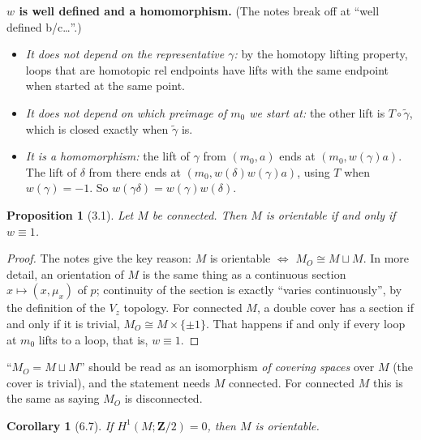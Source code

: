 \documentclass[11pt]{article}
\newcommand{\Z}{\mathbf{Z}}
\newcommand{\MO}{M_O}
\newcommand{\iso}{\cong}
\theoremstyle{namedit}
\newtheorem{cor}{Corollary}
\newtheorem{prop}{Proposition}
\theoremstyle{namedrm}
\begin{document}
\begin{filled}
\textbf{$w$ is well defined and a homomorphism.} (The notes break off at ``well defined b/c\ldots''.)
\begin{itemize}
  \item \emph{It does not depend on the representative $\gamma$:} by the homotopy lifting property,
        loops that are homotopic rel endpoints have lifts with the same endpoint when started at the
        same point.
  \item \emph{It does not depend on which preimage of $m_0$ we start at:} the other lift is
        $T\circ\tilde\gamma$, which is closed exactly when $\tilde\gamma$ is.
  \item \emph{It is a homomorphism:} the lift of $\gamma$ from $(m_0,a)$ ends at $(m_0,w(\gamma)a)$.
        The lift of $\delta$ from there ends at $(m_0,w(\delta)w(\gamma)a)$, using $T$ when
        $w(\gamma)=-1$. So $w(\gamma\delta)=w(\gamma)w(\delta)$.
\end{itemize}
\end{filled}

\begin{prop}[3.1]\label{prop:orient}
Let $M$ be connected. Then $M$ is orientable if and only if $w\equiv1$.
\end{prop}

\begin{proof}
The notes give the key reason: $M$ is orientable $\iff$ $\MO\iso M\sqcup M$. In more detail, an
orientation of $M$ is the same thing as a continuous section $x\mapsto(x,\mu_x)$ of $p$; continuity
of the section is exactly ``varies continuously'', by the definition of the $V_z$ topology. For
connected $M$, a double cover has a section if and only if it is trivial, $\MO\iso M\times\{\pm1\}$.
That happens if and only if every loop at $m_0$ lifts to a loop, that is, $w\equiv1$.
\end{proof}

\begin{correction}[label=c:sqcup]
``$\MO=M\sqcup M$'' should be read as an isomorphism \emph{of covering spaces} over $M$ (the cover
is trivial), and the statement needs $M$ connected. For connected $M$ this is the same as saying
$\MO$ is disconnected.
\end{correction}

\begin{cor}[6.7]
If $H^1(M;\Z/2)=0$, then $M$ is orientable.
\end{cor}
\end{document}
